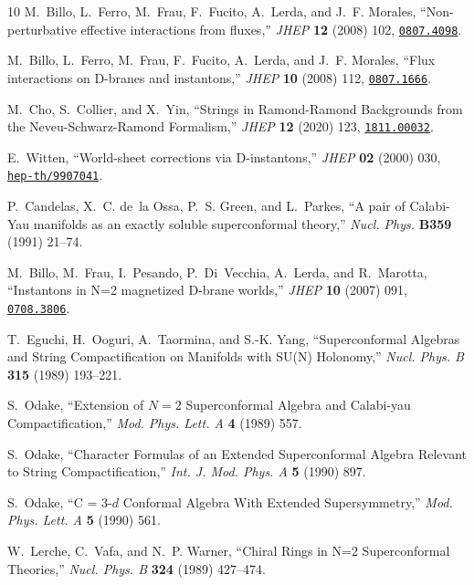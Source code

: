 \documentclass[12pt,a4paper]{article}
\begin{document}
\begin{thebibliography}{10}
	M.~Billo, L.~Ferro, M.~Frau, F.~Fucito, A.~Lerda, and J.~F. Morales,
	``{Non-perturbative effective interactions from fluxes},'' {\em JHEP} {\bf
		12} (2008) 102, \href{http://www.arXiv.org/abs/0807.4098}{{\tt 0807.4098}}.
	
	M.~Billo, L.~Ferro, M.~Frau, F.~Fucito, A.~Lerda, and J.~F. Morales, ``{Flux
		interactions on D-branes and instantons},'' {\em JHEP} {\bf 10} (2008) 112,
	\href{http://www.arXiv.org/abs/0807.1666}{{\tt 0807.1666}}.
	
	M.~Cho, S.~Collier, and X.~Yin, ``{Strings in Ramond-Ramond Backgrounds from
		the Neveu-Schwarz-Ramond Formalism},'' {\em JHEP} {\bf 12} (2020) 123,
	\href{http://www.arXiv.org/abs/1811.00032}{{\tt 1811.00032}}.
	
	E.~Witten, ``{World-sheet corrections via D-instantons},'' {\em JHEP} {\bf 02}
	(2000) 030,
	\href{http://www.arXiv.org/abs/hep-th/9907041}{{\tt hep-th/9907041}}.
	
	P.~Candelas, X.~C. de~la Ossa, P.~S. Green, and L.~Parkes, ``{A pair of
		Calabi-Yau manifolds as an exactly soluble superconformal theory},'' {\em
		Nucl. Phys.} {\bf B359} (1991)
	21--74.
	
	M.~Billo, M.~Frau, I.~Pesando, P.~Di~Vecchia, A.~Lerda, and R.~Marotta,
	``{Instantons in N=2 magnetized D-brane worlds},'' {\em JHEP} {\bf 10} (2007)
	091, \href{http://www.arXiv.org/abs/0708.3806}{{\tt 0708.3806}}.
	
	T.~Eguchi, H.~Ooguri, A.~Taormina, and S.-K. Yang, ``{Superconformal Algebras
		and String Compactification on Manifolds with SU(N) Holonomy},'' {\em Nucl.
		Phys. B} {\bf 315} (1989) 193--221.
	
	S.~Odake, ``{Extension of $N=2$ Superconformal Algebra and Calabi-yau
		Compactification},'' {\em Mod. Phys. Lett. A} {\bf 4} (1989) 557.
	
	S.~Odake, ``{Character Formulas of an Extended Superconformal Algebra Relevant
		to String Compactification},'' {\em Int. J. Mod. Phys. A} {\bf 5} (1990) 897.
	
	S.~Odake, ``{C = 3-$d$ Conformal Algebra With Extended Supersymmetry},'' {\em
		Mod. Phys. Lett. A} {\bf 5} (1990) 561.
	
	W.~Lerche, C.~Vafa, and N.~P. Warner, ``{Chiral Rings in N=2 Superconformal
		Theories},'' {\em Nucl. Phys. B} {\bf 324} (1989) 427--474.
	

\end{thebibliography}
\end{document}
